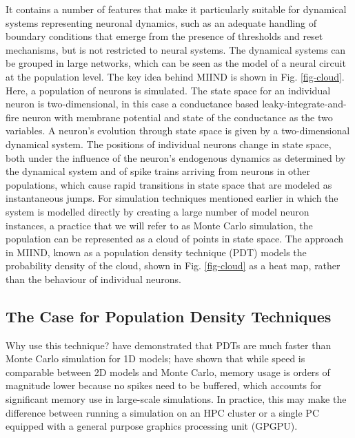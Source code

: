 \documentclass[utf8]{frontiersSCNS} %
\begin{document}
It contains a number of features that make it particularly suitable for dynamical systems representing neuronal dynamics, such as an adequate handling of boundary conditions that emerge from the presence of thresholds and reset mechanisms, but is not restricted to neural systems. The dynamical systems can be grouped in large networks, which can be seen as the model of a neural circuit at the population level.
The key idea behind MIIND is shown in Fig. \ref{fig-cloud}. Here, a population of neurons is simulated. The state space for an individual neuron is two-dimensional, in this case a conductance based leaky-integrate-and-fire neuron with membrane potential and state of the conductance as the two variables. A neuron's evolution through state space is given by a two-dimensional dynamical system. The positions of individual neurons change in state space, both under the influence of the neuron's endogenous dynamics as determined by the dynamical system and of spike trains arriving from neurons in other populations, which cause rapid transitions in state space that are modeled as instantaneous jumps. For simulation techniques mentioned earlier in which the system is modelled directly by creating a large number of model neuron instances, a practice that we will refer to as Monte Carlo simulation, the population can be represented as a cloud of points in state space. The approach in MIIND, known as a population density technique (PDT) models the probability density of the cloud, shown in Fig. \ref{fig-cloud} as a heat map, rather than the behaviour of individual neurons. 

\subsection{The Case for Population Density Techniques} 
Why use this technique?
\cite{omurtag2000,nykamp2000population,kamps2003simple,iyer2013influence} have demonstrated that PDTs are much faster than Monte Carlo simulation for 1D models; \cite{de2019computational} have shown that while speed is comparable between 2D models and Monte Carlo, memory usage is orders of magnitude lower because no spikes need to be buffered, which accounts for significant memory use in large-scale simulations. In practice, this may make the difference between running a simulation on an HPC cluster or a single PC equipped with a general purpose graphics processing unit (GPGPU).
\end{document}
